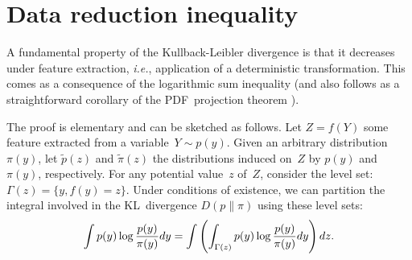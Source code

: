 \documentclass[english]{scrartcl}
\begin{document}



\appendix

\section{Data reduction inequality}
\label{sec:reduction_inequality}

A fundamental property of the Kullback-Leibler divergence is that it decreases under feature extraction, {\em i.e.}, application of a deterministic transformation. This comes as a consequence of the logarithmic sum inequality \cite{Cover-06} (and also follows as a straightforward corollary of the PDF~projection theorem \cite{Minka-04,Baggenstoss-15}). 

The proof is elementary and can be sketched as follows. Let $Z=f(Y)$ some feature extracted from a variable~$Y\sim p(y)$. Given an arbitrary distribution~$\pi(y)$, let  $\tilde{p}(z)$ and $\tilde{\pi}(z)$ the distributions induced on~$Z$ by $p(y)$ and $\pi(y)$, respectively. For any potential value~$z$ of~$Z$, consider the level set: $\Gamma(z)=\{y, f(y)=z\}$. Under conditions of existence, we can partition the integral involved in the KL~divergence $D(p\|\pi)$ using these level sets: 
$$
\int p(y) \log \frac{p(y)}{\pi(y)} dy
=
\int \left( \int_{\Gamma(z)} p(y) \log \frac{p(y)}{\pi(y)} dy \right) dz\\
.
$$
\end{document}
